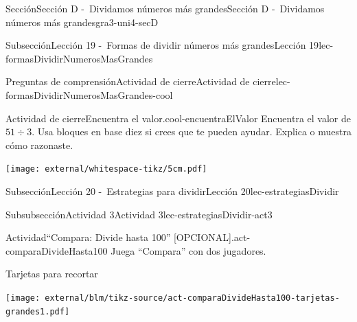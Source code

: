 \begin{sectionptx}{Sección}{Sección D -~Dividamos números más grandes}{}{Sección D -~Dividamos números más grandes}{}{}{gra3-uni4-secD}
\begin{subsectionptx}{Subsección}{Lección 19 -~Formas de dividir números más grandes}{}{Lección 19}{}{}{lec-formasDividirNumerosMasGrandes}
\begin{reading-questions-subsubsection-numberless}{Preguntas de comprensión}{Actividad de cierre}{}{Actividad de cierre}{}{}{lec-formasDividirNumerosMasGrandes-cool}
\begin{project}{Actividad de cierre}{Encuentra el valor.}{cool-encuentraElValor}
Encuentra el valor de \(51 \div 3.\) Usa bloques en base diez si crees que te pueden ayudar. Explica o muestra cómo razonaste.%
\begin{image}{0}{1}{0}{}%
\texttt{[image: external/whitespace-tikz/5cm.pdf]}
\end{image}%
\end{project}%
\end{reading-questions-subsubsection-numberless}
\end{subsectionptx}
%
%
\typeout{************************************************}
\typeout{************************************************}
%
\begin{subsectionptx}{Subsección}{Lección 20 -~Estrategias para dividir}{}{Lección 20}{}{}{lec-estrategiasDividir}
%
%
\typeout{************************************************}
\typeout{************************************************}
%
\begin{subsubsectionptx}{Subsubsección}{Actividad 3}{}{Actividad 3}{}{}{lec-estrategiasDividir-act3}
\begin{activity}{Actividad}{“Compara: Divide hasta 100” [OPCIONAL].}{act-comparaDivideHasta100}%
Juega ``Compara'' con dos jugadores.%
\end{activity}%
\begin{cutoutpage}
Tarjetas para recortar%
\begin{image}{0}{1}{0}{}%
\texttt{[image: external/blm/tikz-source/act-comparaDivideHasta100-tarjetas-grandes1.pdf]}
\end{image}%
\end{cutoutpage}
\begin{cutoutpage}

\end{cutoutpage}
\end{subsubsectionptx}
\end{subsectionptx}
\end{sectionptx}
